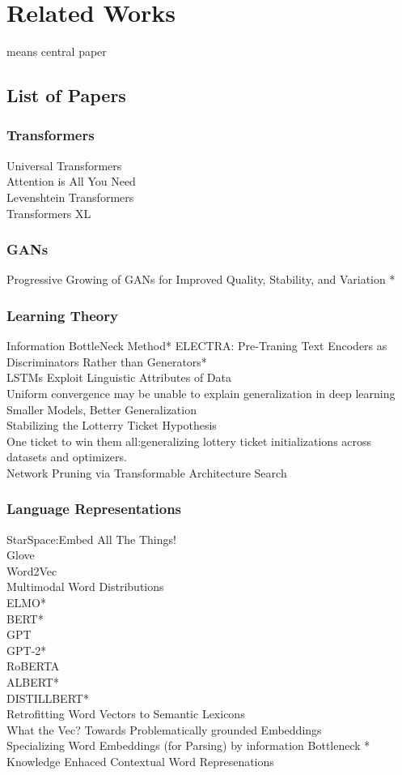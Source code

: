 \documentclass [11pt, proquest] {uwthesis}[2020/08/20]
\begin{document}
\chapter{Related Works}
 means central paper
\section{List of Papers}
\subsection{Transformers}
Universal Transformers \\
Attention is All You Need \\
Levenshtein Transformers \\
Transformers XL \\ 
\subsection{GANs}
Progressive Growing of GANs for Improved Quality, Stability, and Variation *
\subsection{Learning Theory}
Information BottleNeck Method*
ELECTRA: Pre-Traning Text Encoders as Discriminators Rather than Generators*\\
LSTMs Exploit Linguistic Attributes of Data\\
Uniform convergence may be unable to explain generalization in deep learning \\
Smaller Models, Better Generalization \\ 
Stabilizing the Lotterry Ticket Hypothesis \\
One ticket to win them all:generalizing lottery ticket initializations across datasets and optimizers. \\ 
Network Pruning via Transformable Architecture Search

\subsection{Language Representations}
StarSpace:Embed All The Things!\\
Glove \\
Word2Vec \\
Multimodal Word Distributions\\
ELMO*\\
BERT* \\
GPT\\
GPT-2*\\
RoBERTA \\
ALBERT*\\
DISTILLBERT*\\
Retrofitting Word Vectors to Semantic Lexicons \\
What the Vec? Towards Problematically grounded Embeddings \\
Specializing Word Embeddings (for Parsing) by information Bottleneck *\\
Knowledge Enhaced Contextual Word Represenations
\end{document}
